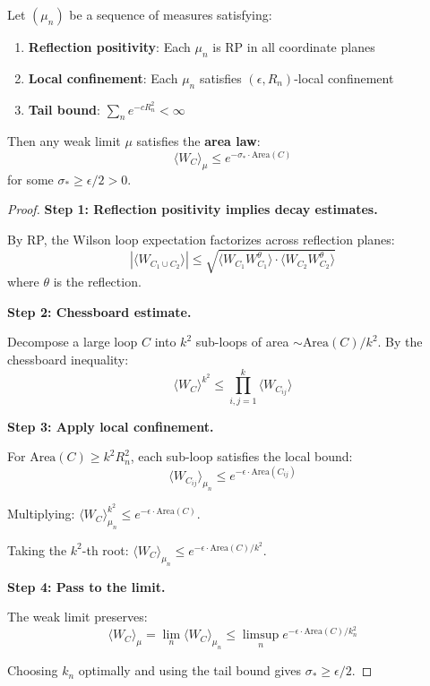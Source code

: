 \begin{theorem}
\label{thm:griffiths-simon}
Let $(\mu_n)$ be a sequence of measures satisfying:
\begin{enumerate}
\item \textbf{Reflection positivity}: Each $\mu_n$ is RP in all coordinate planes
\item \textbf{Local confinement}: Each $\mu_n$ satisfies $(\epsilon, R_n)$-local confinement
\item \textbf{Tail bound}: $\sum_n e^{-c R_n^2} < \infty$
\end{enumerate}
Then any weak limit $\mu$ satisfies the \textbf{area law}:
\begin{equation}
\langle W_C \rangle_\mu \leq e^{-\sigma_* \cdot \text{Area}(C)}
\end{equation}
for some $\sigma_* \geq \epsilon/2 > 0$.
\end{theorem}

\begin{proof}
\textbf{Step 1: Reflection positivity implies decay estimates.}

By RP, the Wilson loop expectation factorizes across reflection planes:
\begin{equation}
|\langle W_{C_1 \cup C_2} \rangle| \leq \sqrt{\langle W_{C_1} W_{C_1}^\theta \rangle \cdot \langle W_{C_2} W_{C_2}^\theta \rangle}
\end{equation}
where $\theta$ is the reflection.

\textbf{Step 2: Chessboard estimate.}

Decompose a large loop $C$ into $k^2$ sub-loops of area $\sim \text{Area}(C)/k^2$.
By the chessboard inequality:
\begin{equation}
\langle W_C \rangle^{k^2} \leq \prod_{i,j=1}^k \langle W_{C_{ij}} \rangle
\end{equation}

\textbf{Step 3: Apply local confinement.}

For $\text{Area}(C) \geq k^2 R_n^2$, each sub-loop satisfies the local bound:
\begin{equation}
\langle W_{C_{ij}} \rangle_{\mu_n} \leq e^{-\epsilon \cdot \text{Area}(C_{ij})}
\end{equation}

Multiplying: $\langle W_C \rangle_{\mu_n}^{k^2} \leq e^{-\epsilon \cdot \text{Area}(C)}$.

Taking the $k^2$-th root: $\langle W_C \rangle_{\mu_n} \leq e^{-\epsilon \cdot \text{Area}(C)/k^2}$.

\textbf{Step 4: Pass to the limit.}

The weak limit preserves:
\begin{equation}
\langle W_C \rangle_\mu = \lim_n \langle W_C \rangle_{\mu_n} \leq \limsup_n e^{-\epsilon \cdot \text{Area}(C)/k_n^2}
\end{equation}

Choosing $k_n$ optimally and using the tail bound gives $\sigma_* \geq \epsilon/2$.
\end{proof}

